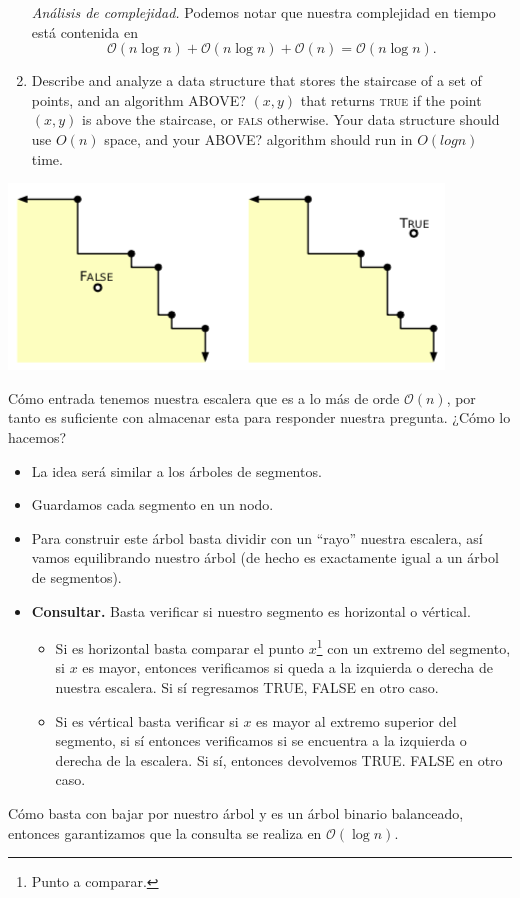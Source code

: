 \begin{enumerate}
      \textit{Análisis de complejidad.} Podemos notar que nuestra complejidad en tiempo está contenida en
      \[\mathcal{O}(n\log n) + \mathcal{O}(n\log n) + \mathcal{O}(n) = \mathcal{O}(n\log n).\]
\item Describe and analyze a data structure that stores the staircase of a set of points, and an
  algorithm ABOVE? $(x, y)$ that returns \textsc{true} if the point $(x, y)$ is above the staircase,
  or \textsc{fals} otherwise. Your data structure should use $O(n)$ space, and your ABOVE? algorithm
  should run in $O(log n)$ time.
\end{enumerate}

\begin{center}
    \includegraphics[scale=0.5]{escalera2}
\end{center}


  Cómo entrada tenemos nuestra escalera que es a lo más de orde $\mathcal{O}(n)$, por tanto es suficiente
  con almacenar esta para responder nuestra pregunta. ¿Cómo lo hacemos?
  \begin{itemize}
  \item La idea será similar a los árboles de segmentos.
  \item Guardamos cada segmento en un nodo.
  \item Para construir este árbol basta dividir con un ``rayo'' nuestra escalera, así vamos equilibrando nuestro árbol
  (de hecho es exactamente igual a un árbol de segmentos).
  \item \textbf{Consultar.} Basta verificar si nuestro segmento es horizontal o vértical.
  \begin{itemize}
  \item Si es horizontal basta comparar el punto $x$\footnote{Punto a comparar.} con un extremo del segmento, si
  $x$ es mayor, entonces verificamos si queda a la izquierda o derecha de nuestra escalera. Si sí regresamos TRUE, FALSE en otro caso.
  \item Si es vértical basta verificar si $x$ es mayor al extremo superior del segmento, si sí entonces verificamos si se
  encuentra a la izquierda o derecha de la escalera. Si sí, entonces devolvemos TRUE. FALSE en otro caso.
  \end{itemize}    
  \end{itemize}

Cómo basta con bajar por nuestro árbol y es un árbol binario balanceado, entonces garantizamos que la consulta se realiza en $\mathcal{O}(\log n)$.
